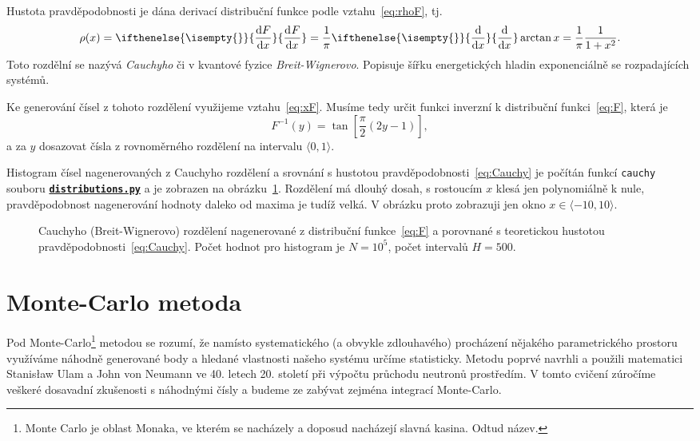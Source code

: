 \documentclass[a4paper,11pt,twoside]{article}
\renewcommand{\d}{\mathrm{d}}           %
\newcommand{\derivative}[3][]{\ifthenelse{\isempty{#1}}	    %
	{\frac{\d{#2}}{\d{#3}}}
	{\frac{\d^{#1}{#2}}{\d{#3}^{#1}}}
}
\def\code#1{\textnormal{\texttt{#1}}}
\def\ghfile#1#2{\textnormal{\textbf{\texttt{\href{https://github.com/PavelStransky/PCInPhysics/blob/main/#1#2}{#2}}}}}
\theoremstyle{red}
\theoremstyle{green}
\begin{document}
    \begin{solution}
        Hustota pravděpodobnosti je dána derivací distribuční funkce podle vztahu~\eqref{eq:rhoF}, tj.
        \begin{equation}
            \label{eq:Cauchy}
            \rho(x)=\derivative{F}{x}=\frac{1}{\pi}\derivative{}{x}\arctan{x}=\frac{1}{\pi}\frac{1}{1+x^{2}}.
        \end{equation}
        Toto rozdělní se nazývá \emph{Cauchyho} či v kvantové fyzice \emph{Breit-Wignerovo}. 
        Popisuje šířku energetických hladin exponenciálně se rozpadajících systémů.

        Ke generování čísel z tohoto rozdělení využijeme vztahu~\eqref{eq:xF}.
        Musíme tedy určit funkci inverzní k distribuční funkci~\eqref{eq:F}, která je
        \begin{equation}
            F^{-1}(y)=\tan\left[\frac{\pi}{2}\left(2y-1\right)\right],
        \end{equation}
        a za $y$ dosazovat čísla z rovnoměrného rozdělení na intervalu $\langle0,1\rangle$.

        Histogram čísel nagenerovaných z Cauchyho rozdělení a srovnání s hustotou pravděpodobnosti~\eqref{eq:Cauchy} je počítán funkcí \code{cauchy} souboru \ghfile{python/histogram/}{distributions.py} a je zobrazen na obrázku~\ref{fig:F}.
        Rozdělení má dlouhý dosah, s rostoucím $x$ klesá jen polynomiálně k nule, pravděpodobnost nagenerování hodnoty daleko od maxima je tudíž velká. 
        V obrázku proto zobrazuji jen okno $x\in\langle-10,10\rangle$.

        \begin{figure}[!htb]
            \centering{}
            \caption{
                \protect\small
                Cauchyho (Breit-Wignerovo) rozdělení nagenerované z distribuční funkce~\eqref{eq:F} a porovnané s teoretickou hustotou pravděpodobnosti~\eqref{eq:Cauchy}.
                Počet hodnot pro histogram je $N=10^5$, počet intervalů $H=500$.
            }
            \label{fig:F}
        \end{figure}    
    \end{solution}

\section{Monte-Carlo metoda}
    Pod Monte-Carlo\footnote{
        Monte Carlo je oblast Monaka, ve kterém se nacházely a doposud nacházejí slavná kasina.        
        Odtud název.
    }
    metodou se rozumí, že namísto systematického (a obvykle zdlouhavého) procházení nějakého parametrického prostoru využíváme náhodně generované body a hledané vlastnosti našeho systému určíme statisticky.
    Metodu poprvé navrhli a použili matematici Stanisław Ulam a John von Neumann ve 40. letech 20. století při výpočtu průchodu neutronů prostředím.
    V tomto cvičení zúročíme veškeré dosavadní zkušenosti s náhodnými čísly a budeme ze zabývat zejména integrací Monte-Carlo.
\end{document}
